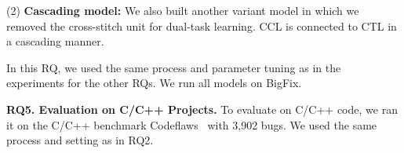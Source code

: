
(2) \textbf{Cascading model:} We also built another variant model in
which we removed the cross-stitch unit for dual-task learning. CCL is
connected to CTL in a cascading manner.



In this RQ, we used the same process and parameter tuning as in the
experiments for the other RQs. We run all models on BigFix.


{\bf RQ5. Evaluation on C/C++ Projects.}  To evaluate {\tool} on C/C++
code, we ran it on the C/C++ benchmark
Codeflaws~\cite{tan2017codeflaws} with 3,902 bugs. 
We used the same process and setting as in RQ2.
